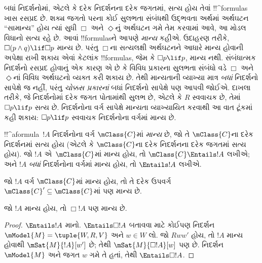 \documentclass[../../../include/open-logic-section]{subfiles}
\begin{document}


\begin{explain}
  બધાં નિદર્શનોમાં, એટલે કે દરેક નિદર્શનના દરેક જગતમાં,
  સત્ય હોય તેવાં !!^{formula}s ખાસ રસપ્રદ છે. શક્ય જગતો
  પરના કોઈ સુલભતા સંબંધથી ઉદ્ભવતા અર્થમાં અર્થઘટન
  ``સામાન્ય'' હોય ત્યાં સુધી $\Box$ અને $\Diamond$નું
  અર્થઘટન ગમે તેમ કરવામાં આવે, આ મોડલ વિધાનો
  સત્ય રહે છે. આવાં !!{formula}sને આપણે \emph{માન્ય} કહીએ.
  ઉદાહરણ તરીકે, $\Box(p \land q) \lif \Box p$ માન્ય છે.
  પરંતુ $\Box$ના સત્યલક્ષી અર્થઘટનને આધારે માન્ય હોવાની
  અપેક્ષા રાખી શકાય એવાં કેટલાંક !!{formula}s, જેમ કે
  $\Box p \lif p$, માન્ય નથી. સંબંધાત્મક નિદર્શનો
  રસપ્રદ હોવાનું એક કારણ એ છે કે વિવિધ પ્રકારના
  સુલભતા સંબંધો વડે $\Box$ અને $\Diamond$નાં વિવિધ
  અર્થઘટનો વ્યક્ત કરી શકાય છે. તેથી માન્યતાની વ્યાખ્યા
  માત્ર \emph{બધાં} નિદર્શનો સાપેક્ષે જ નહીં, પરંતુ
  \emph{ચોક્કસ પ્રકારનાં} બધાં નિદર્શનો સાપેક્ષે પણ
  આપવી જોઈએ. દાખલા તરીકે, જે નિદર્શનોમાં દરેક
  જગત પોતામાંથી સુલભ છે, એટલે કે $R$ સ્વવાચક છે,
  તેમાં $\Box p \lif p$ સત્ય છે. નિદર્શનોના વર્ગ
  સાપેક્ષે માન્યતા વ્યાખ્યાયિત કરવાથી આ વાત ટૂંકમાં
  કહી શકાય: $\Box p \lif p$ સ્વવાચક નિદર્શનોના
  વર્ગમાં માન્ય છે.
\end{explain}

\begin{defn}
  !!^a{formula}~$!A$ નિદર્શનોના વર્ગ $\mClass{C}$માં
  \emph{માન્ય} છે, જો તે $\mClass{C}$ના દરેક નિદર્શનમાં
  સત્ય હોય (એટલે કે $\mClass{C}$ના દરેક નિદર્શનના
  દરેક જગતમાં સત્ય હોય). જો $!A$ એ~$\mClass{C}$માં
  માન્ય હોય, તો $\mClass{C} \Entails !A$ લખીએ;
  અને $!A$ \emph{બધાં} નિદર્શનોના વર્ગમાં માન્ય હોય,
  તો $\Entails !A$ લખીએ.
\end{defn}

\begin{prop}
  જો $!A$ વર્ગ $\mClass{C}$માં માન્ય હોય, તો તે દરેક
  ઉપવર્ગ $\mClass{C}' \subseteq \mClass{C}$માં પણ માન્ય છે.
\end{prop}

\begin{prop}
  જો $!A$ માન્ય હોય, તો $\Box!A$ પણ માન્ય છે.
\end{prop}

\begin{proof}
  $\Entails !A$ માનો. $\Entails \Box!A$ બતાવવા માટે
  કોઈપણ નિદર્શન $\mModel{M} =
  \tuple{W, R, V}$ અને $w \in W$ લો. જો $Rww'$ હોય,
  તો $!A$ માન્ય હોવાથી $\mSat{M}{!A}[w']$ છે;
  તેથી $\mSat{M}{\Box!A}[w]$ પણ છે. નિદર્શન
  $\mModel{M}$ અને જગત $w$ ગમે તે હતાં, તેથી
  $\Entails \Box!A$.
\end{proof}
\end{document}
